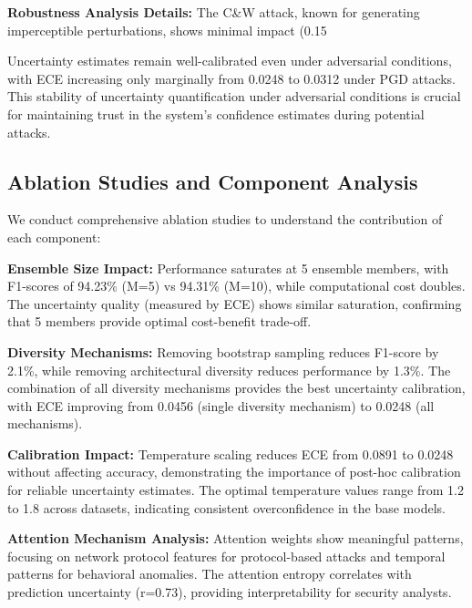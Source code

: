 \documentclass[journal]{IEEEtran}
\begin{document}
\textbf{Robustness Analysis Details:} The C\&W attack, known for generating imperceptible perturbations, shows minimal impact (0.15%

Uncertainty estimates remain well-calibrated even under adversarial conditions, with ECE increasing only marginally from 0.0248 to 0.0312 under PGD attacks. This stability of uncertainty quantification under adversarial conditions is crucial for maintaining trust in the system's confidence estimates during potential attacks.

\subsection{Ablation Studies and Component Analysis}

We conduct comprehensive ablation studies to understand the contribution of each component:

\textbf{Ensemble Size Impact:} Performance saturates at 5 ensemble members, with F1-scores of 94.23\% (M=5) vs 94.31\% (M=10), while computational cost doubles. The uncertainty quality (measured by ECE) shows similar saturation, confirming that 5 members provide optimal cost-benefit trade-off.

\textbf{Diversity Mechanisms:} Removing bootstrap sampling reduces F1-score by 2.1\%, while removing architectural diversity reduces performance by 1.3\%. The combination of all diversity mechanisms provides the best uncertainty calibration, with ECE improving from 0.0456 (single diversity mechanism) to 0.0248 (all mechanisms).

\textbf{Calibration Impact:} Temperature scaling reduces ECE from 0.0891 to 0.0248 without affecting accuracy, demonstrating the importance of post-hoc calibration for reliable uncertainty estimates. The optimal temperature values range from 1.2 to 1.8 across datasets, indicating consistent overconfidence in the base models.

\textbf{Attention Mechanism Analysis:} Attention weights show meaningful patterns, focusing on network protocol features for protocol-based attacks and temporal patterns for behavioral anomalies. The attention entropy correlates with prediction uncertainty (r=0.73), providing interpretability for security analysts.
\end{document}
